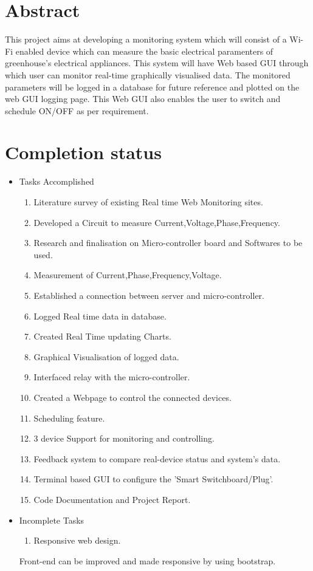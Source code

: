 \documentclass[a4paper,12pt,oneside]{book}
\begin{document}
\section{Abstract}
\hspace{7mm}This project aims at developing a monitoring system which will consist of a Wi-Fi enabled device which can measure the basic electrical paramenters of greenhouse's electrical appliances. This system will have Web based GUI through which user can monitor real-time graphically visualised data. 
The monitored parameters will be logged in a database for future reference and  plotted on the web GUI logging page. This Web GUI also enables the user to switch and schedule ON/OFF as per requirement.
\\

\newpage

\section{Completion status}
\begin{itemize}
	\item{Tasks Accomplished}
	\setlength\itemsep{0.2cm}
	\begin{enumerate}
		\item{Literature survey of existing Real time Web Monitoring sites. }    
		\item{Developed a Circuit to measure Current,Voltage,Phase,Frequency.}
		\item{Research and finalisation on Micro-controller board and Softwares to be used.}
		\item{Measurement of Current,Phase,Frequency,Voltage.}
		\item{Established a connection between server and micro-controller.}
		\item{Logged Real time data in database.}
		\item{Created Real Time updating Charts.}
		\item{Graphical Visualisation of logged data.}
		\item{Interfaced relay with the micro-controller.}
		\item{Created a Webpage to control the connected devices.}
		\item{Scheduling feature. }
		\item{3 device Support for monitoring and controlling.}
		\item{Feedback system to compare real-device status and system's  data.}
		\item{Terminal based GUI to configure the 'Smart Switchboard/Plug'.}
		\item{Code Documentation and Project Report.}
	\end{enumerate}
	\item{Incomplete Tasks}
	\begin{enumerate}
		\item{Responsive web design. }
	\end{enumerate}
	\par Front-end can be improved and made responsive by using bootstrap.   
\end{itemize}
\end{document}
